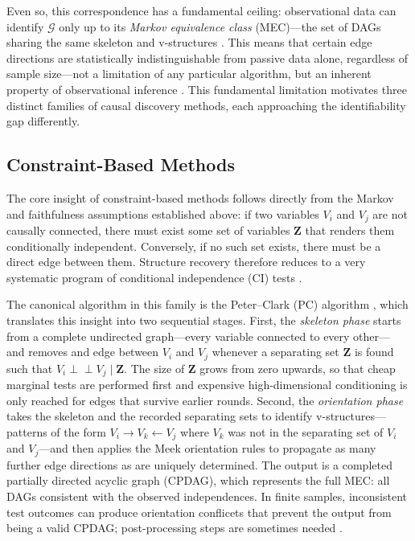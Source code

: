Even so, this correspondence has a fundamental ceiling: observational data can identify $\mathcal{G}$ only up to its \emph{Markov equivalence class} (MEC)---the set of DAGs sharing the same skeleton and v-structures \cite{Verma1990EquivalenceAS}. This means that certain edge directions are statistically indistinguishable from passive data alone, regardless of sample size---not a limitation of any particular algorithm, but an inherent property of observational inference \cite{Peters2017ElementsOC}. This fundamental limitation motivates three distinct families of causal discovery methods, each approaching the identifiability gap differently.


\subsection*{Constraint-Based Methods}\label{sec:constraint-based}
The core insight of constraint-based methods follows directly from the Markov and faithfulness assumptions established above: if two variables $V_i$ and $V_j$ are not causally connected, there must exist some set of variables $\mathbf{Z}$ that renders them conditionally independent. Conversely, if no such set exists, there must be a direct edge between them. Structure recovery therefore reduces to a very systematic program of conditional independence (CI) tests \cite{Spirtes2001CausationPA, Pearl_2009}.

The canonical algorithm in this family is the Peter--Clark (PC) algorithm \cite{Spirtes2001CausationPA}, which translates this insight into two sequential stages.
First, the \emph{skeleton phase} starts from a complete undirected graph---every variable connected to every other--- and removes and edge between $V_i$ and $V_j$ whenever a separating set $\mathbf{Z}$ is found such that $V_i \perp\!\!\!\perp V_j \mid \mathbf{Z}$.
The size of $\mathbf{Z}$ grows from zero upwards, so that cheap marginal tests are performed first and expensive high-dimensional conditioning is only reached for edges that survive earlier rounds.
Second, the \emph{orientation phase} takes the skeleton and the recorded separating sets to identify v-structures---patterns of the form $V_i \to V_k \leftarrow V_j$ where $V_k$ was not in the separating set of $V_i$ and $V_j$---and then applies the Meek orientation rules \cite{Meek1995CausalIA} to propagate as many further edge directions as are uniquely determined. The output is a completed partially directed acyclic graph (CPDAG), which represents the full MEC: all DAGs consistent with the observed independences. In finite samples, inconsistent test outcomes can produce orientation conflicets that prevent the output from being a valid CPDAG; post-processing steps are sometimes needed \cite{Spirtes2001CausationPA}.

